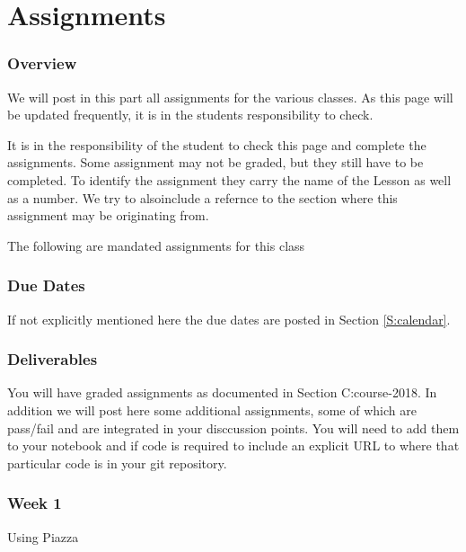 \part{Assignments}

\section{Overview}
\FILENAME

We will post in this part all assignments for the various classes. As
this page will be updated frequently, it is in the students
responsibility to check.

It is in the
responsibility of the student to check this page and complete the
assignments. Some assignment may not be graded, but they still have to
be completed. To identify the assignment they carry the name of the
Lesson as well as a number. We try to alsoinclude a refernce to the
section where this assignment may be originating from.

The following are mandated assignments for this class

\section{Due Dates}

If not explicitly mentioned here the due dates are posted in Section
\ref{S:calendar}.

\section{Deliverables}

You will have graded assignments as documented in Section
{C:course-2018}. In addition we will post here some additional
assignments, some of which are pass/fail and are integrated in your
disccussion points. You will need to add them to your notebook and if
code is required to include an explicit URL to where that particular
code is in your git repository.

\section{Week 1}

Using Piazza

